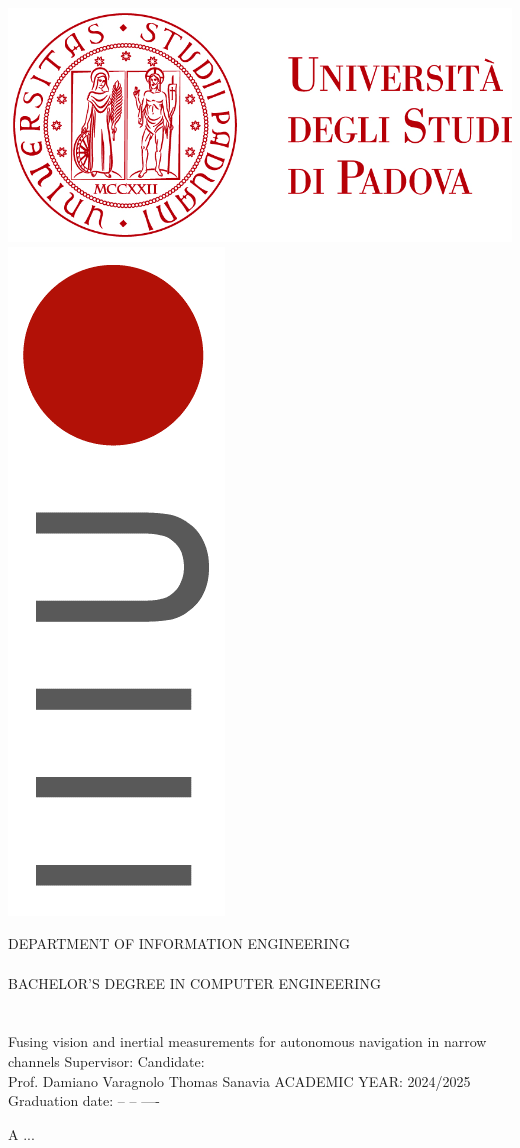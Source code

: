 \documentclass[a4paper,12pt,twoside,openright]{book}
\begin{document}
\frontmatter
\begin{titlepage}
	\begin{flushleft}
		\includegraphics[width=0.3\columnwidth]{images/logo_unipd.png}
		\hspace{\fill}
		\includegraphics[width=0.05\columnwidth]{images/logo_DEI.png}
		\hspace{0.01 cm}
		\begin{minipage}[b][1,8 cm][c]{0.3\columnwidth}
			\textsf{{\color{Sepia}{DIPARTIMENTO\\DI INGEGNERIA\\DELL'INFORMAZIONE}}}
		\end{minipage}
	\end{flushleft}
	
	\vfill
	\begin{center}
		\begin{large}
			DEPARTMENT OF INFORMATION ENGINEERING
			\\~\\
			BACHELOR'S DEGREE IN COMPUTER ENGINEERING
			\\~\\~\\
			Fusing vision and inertial measurements for autonomous navigation in narrow channels
			\vfill
			Supervisor: 
			\hfill
			Candidate:
			\\
			Prof. Damiano Varagnolo
			\hfill
			Thomas Sanavia
			\vfill
			ACADEMIC YEAR: 2024/2025
			\\
			Graduation date: -- -- ----
			\vfill
		\end{large}
	\end{center}
	
\end{titlepage}


\cleardoublepage %
\thispagestyle{empty} %

\null
\vspace{2cm}
\begin{flushright}
A ...
\end{flushright}
\vfill
\end{document}
